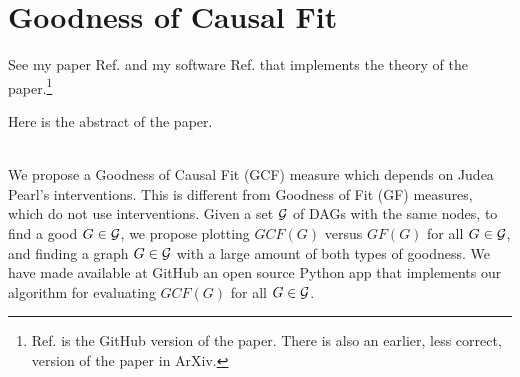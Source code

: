 \chapter{Goodness of Causal Fit}
\label{ch-good-causal-fit}
See my paper Ref.\cite{tucci-gcf}
and my software  Ref.\cite{tucci-dag-lie-det}
that implements the theory of the paper.\footnote{Ref.\cite{tucci-gcf} is the GitHub version of the paper. There is also an earlier, less correct, version of the paper in ArXiv.}
 

Here is the abstract of the paper.

\\
We propose a 
Goodness of Causal Fit (GCF) measure
which depends 
on Judea Pearl's  interventions.
This is different
from Goodness of Fit (GF) measures,
which do not use interventions.
Given a set ${\cal G}$
of DAGs with the same nodes,
to find a good $G\in {\cal G}$,
we propose plotting
$GCF(G)$ versus $GF(G)$
for all $G\in {\cal G}$,
and finding a 
graph $G\in {\cal G}$  with 
a large amount 
of both types of goodness.
We have made 
available at GitHub
an open source Python app that implements
our algorithm for evaluating
$GCF(G)$ for all $G\in{\cal G}$.
